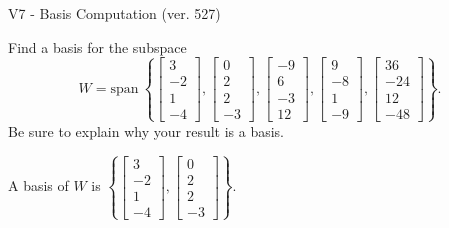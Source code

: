 \begin{exercise}
  \begin{exerciseTitle}V7 - Basis Computation (ver. 527)\end{exerciseTitle}
  \begin{exerciseStatement}
    Find a basis for the subspace 
\[W=\mathrm{span}\ \left\{\left[\begin{array}{r}
3 \\
-2 \\
1 \\
-4
\end{array}\right] , \left[\begin{array}{r}
0 \\
2 \\
2 \\
-3
\end{array}\right] , \left[\begin{array}{r}
-9 \\
6 \\
-3 \\
12
\end{array}\right] , \left[\begin{array}{r}
9 \\
-8 \\
1 \\
-9
\end{array}\right] , \left[\begin{array}{r}
36 \\
-24 \\
12 \\
-48
\end{array}\right]\right\}.\]
 Be sure to explain why your result is a basis.


  \end{exerciseStatement}
  \begin{exerciseAnswer}
   A basis of \(W\) is  \(\left\{\left[\begin{array}{r}
3 \\
-2 \\
1 \\
-4
\end{array}\right] , \left[\begin{array}{r}
0 \\
2 \\
2 \\
-3
\end{array}\right]\right\}\).
  


  \end{exerciseAnswer}
\end{exercise}